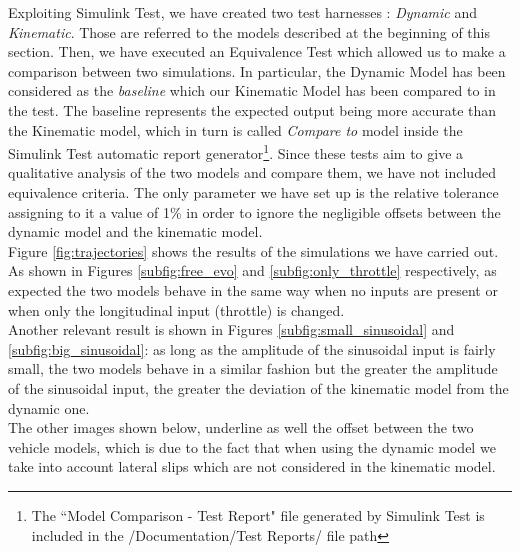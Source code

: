 Exploiting Simulink Test, we have created two test harnesses : \textit{Dynamic} and \textit{Kinematic}. Those are referred to the models described at the beginning of this section. Then, we have executed an Equivalence Test which allowed us to make a comparison between two simulations. In particular, the Dynamic Model has been considered as the \textit{baseline} which our Kinematic Model has been compared to in the test. The baseline represents the expected output being more accurate than the Kinematic model, which in turn is called \textit{Compare to} model inside the Simulink Test automatic report generator\footnote{The ``Model Comparison - Test Report" file generated by Simulink Test is included in the /Documentation/Test Reports/ file path}. 
Since these tests aim to give a qualitative analysis of the two models and compare them, we have not included equivalence criteria.
The only parameter we have set up is the relative tolerance assigning to it a value of 1\% in order to ignore the negligible offsets between the dynamic model and the kinematic model.\\
Figure \ref{fig:trajectories} shows the results of the simulations we have carried out. 
As shown in Figures \ref{subfig:free_evo} and \ref{subfig:only_throttle} respectively, as expected the two models behave in the same way when no inputs are present or when only the longitudinal input (throttle) is changed. \\ Another relevant result is shown in Figures \ref{subfig:small_sinusoidal} and \ref{subfig:big_sinusoidal}: as long as the amplitude of the sinusoidal input is fairly small, the two models behave in a similar fashion but the greater the amplitude of the sinusoidal input, the greater the deviation of the kinematic model from the dynamic one.\\
The other images shown below, underline as well the offset between the two vehicle models, which is due to the fact that when using the dynamic model we take into account lateral slips which are not considered in the kinematic model.


